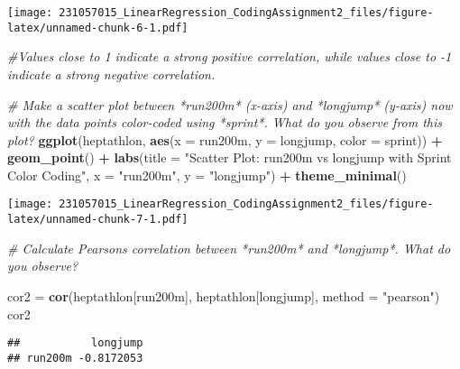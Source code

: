 \documentclass[
]{article}
\newenvironment{Shaded}{\begin{snugshade}}{\end{snugshade}}
\newcommand{\AttributeTok}[1]{\textcolor[rgb]{0.13,0.29,0.53}{#1}}
\newcommand{\CommentTok}[1]{\textcolor[rgb]{0.56,0.35,0.01}{\textit{#1}}}
\newcommand{\FunctionTok}[1]{\textcolor[rgb]{0.13,0.29,0.53}{\textbf{#1}}}
\newcommand{\NormalTok}[1]{#1}
\newcommand{\OtherTok}[1]{\textcolor[rgb]{0.56,0.35,0.01}{#1}}
\newcommand{\SpecialCharTok}[1]{\textcolor[rgb]{0.81,0.36,0.00}{\textbf{#1}}}
\newcommand{\StringTok}[1]{\textcolor[rgb]{0.31,0.60,0.02}{#1}}
\begin{document}
\texttt{[image: 231057015\_LinearRegression\_CodingAssignment2\_files/figure-latex/unnamed-chunk-6-1.pdf]}

\begin{Shaded}
\begin{Highlighting}[]
\CommentTok{\#Values close to 1 indicate a strong positive correlation, while values close to {-}1 indicate a strong negative correlation.}
\end{Highlighting}
\end{Shaded}

\begin{Shaded}
\begin{Highlighting}[]
\CommentTok{\# Make a scatter plot between *run200m* (x{-}axis) and *longjump* (y{-}axis) now with the data points color{-}coded using *sprint*. What do you observe from this plot?}
\FunctionTok{ggplot}\NormalTok{(heptathlon, }\FunctionTok{aes}\NormalTok{(}\AttributeTok{x =}\NormalTok{ run200m, }\AttributeTok{y =}\NormalTok{ longjump, }\AttributeTok{color =}\NormalTok{ sprint)) }\SpecialCharTok{+}
  \FunctionTok{geom\_point}\NormalTok{() }\SpecialCharTok{+}
  \FunctionTok{labs}\NormalTok{(}\AttributeTok{title =} \StringTok{"Scatter Plot: run200m vs longjump with Sprint Color Coding"}\NormalTok{,}
       \AttributeTok{x =} \StringTok{"run200m"}\NormalTok{, }\AttributeTok{y =} \StringTok{"longjump"}\NormalTok{) }\SpecialCharTok{+} \FunctionTok{theme\_minimal}\NormalTok{()}
\end{Highlighting}
\end{Shaded}

\texttt{[image: 231057015\_LinearRegression\_CodingAssignment2\_files/figure-latex/unnamed-chunk-7-1.pdf]}

\begin{Shaded}
\begin{Highlighting}[]
\CommentTok{\# Calculate Pearson\textquotesingle{}s correlation between *run200m* and *longjump*. What do you observe?}

\NormalTok{cor2 }\OtherTok{=} \FunctionTok{cor}\NormalTok{(heptathlon[}\StringTok{\textquotesingle{}run200m\textquotesingle{}}\NormalTok{], heptathlon[}\StringTok{\textquotesingle{}longjump\textquotesingle{}}\NormalTok{], }\AttributeTok{method =} \StringTok{"pearson"}\NormalTok{)}
\NormalTok{cor2}
\end{Highlighting}
\end{Shaded}

\begin{verbatim}
##           longjump
## run200m -0.8172053
\end{verbatim}
\end{document}
